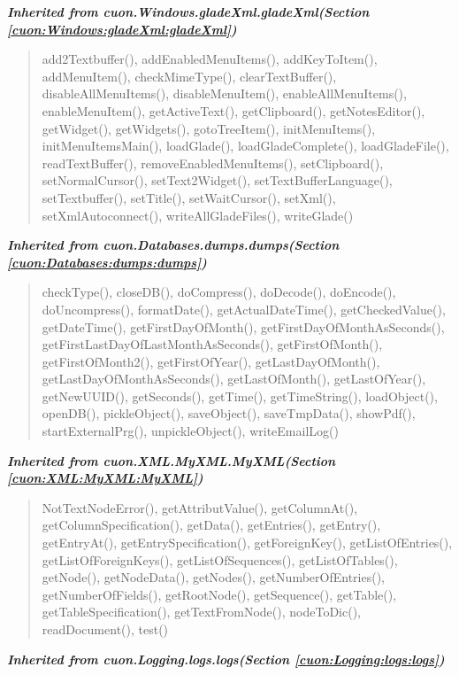 \large{\textbf{\textit{Inherited from cuon.Windows.gladeXml.gladeXml\textit{(Section \ref{cuon:Windows:gladeXml:gladeXml})}}}}

\begin{quote}
add2Textbuffer(), addEnabledMenuItems(), addKeyToItem(), addMenuItem(), checkMimeType(), clearTextBuffer(), disableAllMenuItems(), disableMenuItem(), enableAllMenuItems(), enableMenuItem(), getActiveText(), getClipboard(), getNotesEditor(), getWidget(), getWidgets(), gotoTreeItem(), initMenuItems(), initMenuItemsMain(), loadGlade(), loadGladeComplete(), loadGladeFile(), readTextBuffer(), removeEnabledMenuItems(), setClipboard(), setNormalCursor(), setText2Widget(), setTextBufferLanguage(), setTextbuffer(), setTitle(), setWaitCursor(), setXml(), setXmlAutoconnect(), writeAllGladeFiles(), writeGlade()
\end{quote}

\large{\textbf{\textit{Inherited from cuon.Databases.dumps.dumps\textit{(Section \ref{cuon:Databases:dumps:dumps})}}}}

\begin{quote}
checkType(), closeDB(), doCompress(), doDecode(), doEncode(), doUncompress(), formatDate(), getActualDateTime(), getCheckedValue(), getDateTime(), getFirstDayOfMonth(), getFirstDayOfMonthAsSeconds(), getFirstLastDayOfLastMonthAsSeconds(), getFirstOfMonth(), getFirstOfMonth2(), getFirstOfYear(), getLastDayOfMonth(), getLastDayOfMonthAsSeconds(), getLastOfMonth(), getLastOfYear(), getNewUUID(), getSeconds(), getTime(), getTimeString(), loadObject(), openDB(), pickleObject(), saveObject(), saveTmpData(), showPdf(), startExternalPrg(), unpickleObject(), writeEmailLog()
\end{quote}

\large{\textbf{\textit{Inherited from cuon.XML.MyXML.MyXML\textit{(Section \ref{cuon:XML:MyXML:MyXML})}}}}

\begin{quote}
NotTextNodeError(), getAttributValue(), getColumnAt(), getColumnSpecification(), getData(), getEntries(), getEntry(), getEntryAt(), getEntrySpecification(), getForeignKey(), getListOfEntries(), getListOfForeignKeys(), getListOfSequences(), getListOfTables(), getNode(), getNodeData(), getNodes(), getNumberOfEntries(), getNumberOfFields(), getRootNode(), getSequence(), getTable(), getTableSpecification(), getTextFromNode(), nodeToDic(), readDocument(), test()
\end{quote}

\large{\textbf{\textit{Inherited from cuon.Logging.logs.logs\textit{(Section \ref{cuon:Logging:logs:logs})}}}}

